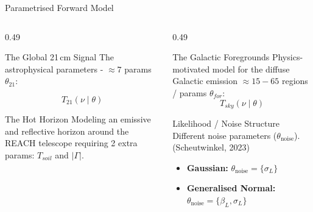 \documentclass{beamer}
\begin{document}
\begin{frame}{Parametrised Forward Model}
\vspace{-1.9em}
\begin{columns}

\begin{column}{0.49\textwidth}
\vspace{-1.5em}
{

\begin{block}{The Global 21\,cm Signal}
\vspace{0.4em}
\small 
The astrophysical parameters - $\approx 7$ params
\(\theta_{21}\): 

\large
\[
T_{21}(\nu \mid \theta)
\]

\end{block}
}

\begin{block}{The Hot Horizon}
\small 
Modeling an emissive and reflective horizon around the REACH telescope requiring 2 extra params: $T_{soil}$ and $|\Gamma|$.
\vspace{2em}
\end{block}

\end{column}

\begin{column}{0.49\textwidth}
\vspace{-1.55em}
\begin{block}{The Galactic Foregrounds}
\small 
Physics-motivated model for the diffuse Galactic emission $\approx 15 - 65$ regions / params \(\theta_{for}\): 
\large
\vspace{-0.5em}
\[
T_{sky}(\nu \mid \theta)
\]
\vspace{-1.5em}
\end{block}

\begin{block}{Likelihood / Noise Structure}
\small
Different noise parameters
(\(\theta_{\mathrm{noise}}\)).  
{\tiny (Scheutwinkel, 2023)}
\vspace{-0.3em}
\scriptsize

\begin{itemize}
\item \textbf{Gaussian:} \(\theta_{\mathrm{noise}} = \{\sigma_L\}\)

\item \textbf{Generalised Normal:} \(\theta_{\mathrm{noise}} = \{\beta_L, \sigma_L\}\)


\end{itemize}
\end{block}
\end{column}
\end{columns}
\end{frame}
\end{document}
